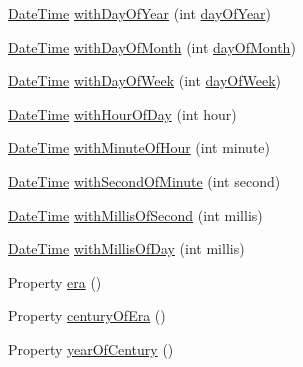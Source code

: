 \begin{DoxyCompactItemize}
\hyperlink{classorg_1_1joda_1_1time_1_1_date_time}{Date\-Time} \hyperlink{classorg_1_1joda_1_1time_1_1_date_time_a96269da7ff4641922851c38621f70d67}{with\-Day\-Of\-Year} (int \hyperlink{classorg_1_1joda_1_1time_1_1_date_time_a2c4dc0f893bacc99b4bd120ada03a13f}{day\-Of\-Year})
\item 
\hyperlink{classorg_1_1joda_1_1time_1_1_date_time}{Date\-Time} \hyperlink{classorg_1_1joda_1_1time_1_1_date_time_ae049116df33decc171e789d39e7ef4a3}{with\-Day\-Of\-Month} (int \hyperlink{classorg_1_1joda_1_1time_1_1_date_time_ae2edf04c8cc742fdfcd838acf53f8751}{day\-Of\-Month})
\item 
\hyperlink{classorg_1_1joda_1_1time_1_1_date_time}{Date\-Time} \hyperlink{classorg_1_1joda_1_1time_1_1_date_time_a0091256889856ccbccff4dd927ff3f9f}{with\-Day\-Of\-Week} (int \hyperlink{classorg_1_1joda_1_1time_1_1_date_time_aa1e61ab5bdfee2ac94d3d7962e359ab3}{day\-Of\-Week})
\item 
\hyperlink{classorg_1_1joda_1_1time_1_1_date_time}{Date\-Time} \hyperlink{classorg_1_1joda_1_1time_1_1_date_time_a66250da5d0c5ddcab4d00b1992e91fee}{with\-Hour\-Of\-Day} (int hour)
\item 
\hyperlink{classorg_1_1joda_1_1time_1_1_date_time}{Date\-Time} \hyperlink{classorg_1_1joda_1_1time_1_1_date_time_ad34e7fc368c12f96f86b743c0350d8dd}{with\-Minute\-Of\-Hour} (int minute)
\item 
\hyperlink{classorg_1_1joda_1_1time_1_1_date_time}{Date\-Time} \hyperlink{classorg_1_1joda_1_1time_1_1_date_time_a2fe8d4451dc71957478aaee5f660938d}{with\-Second\-Of\-Minute} (int second)
\item 
\hyperlink{classorg_1_1joda_1_1time_1_1_date_time}{Date\-Time} \hyperlink{classorg_1_1joda_1_1time_1_1_date_time_a35ac6bf7501544b196381e4d9cbf0981}{with\-Millis\-Of\-Second} (int millis)
\item 
\hyperlink{classorg_1_1joda_1_1time_1_1_date_time}{Date\-Time} \hyperlink{classorg_1_1joda_1_1time_1_1_date_time_a0228347f13e18348221beb901658a35a}{with\-Millis\-Of\-Day} (int millis)
\item 
Property \hyperlink{classorg_1_1joda_1_1time_1_1_date_time_ab8216207cd8916a151770319c97d8fa2}{era} ()
\item 
Property \hyperlink{classorg_1_1joda_1_1time_1_1_date_time_a88d74c1ce52b4d95b031ff94d5ffee7a}{century\-Of\-Era} ()
\item 
Property \hyperlink{classorg_1_1joda_1_1time_1_1_date_time_aa53d040c44c064b6458223021afeb615}{year\-Of\-Century} ()
\item 

\end{DoxyCompactItemize}
